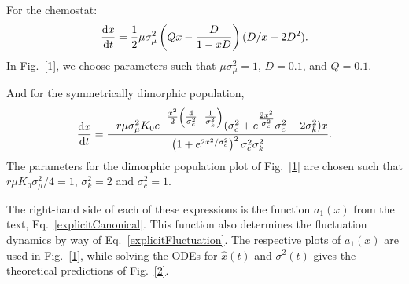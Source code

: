 For the chemostat:
\begin{equation}
	\frac{\mathrm{d} x}{\mathrm{d} t} = \frac{1}{2} \mu \sigma^2_{\mu} \left(Qx-\frac{D}{1-xD}\right) (D/x-2D^2) \label{chemostat_a1} .
\end{equation}
In Fig.~\ref{1}, we choose parameters such that $\mu \sigma^2_{\mu} = 1$, $D = 0.1$, and $Q=0.1$.  

And for the symmetrically dimorphic population,
\begin{equation}
	\frac{\mathrm{d} x}{\mathrm{d} t} = \frac{-r \mu \sigma^2_{\mu} K_0 	e^{-\tfrac{x^2}{2}\left(\tfrac{4}{\sigma_c^2}-\tfrac{1}{\sigma_k^2}\right) } (\sigma^2_c+e^{\tfrac{2 x^2}{\sigma^2_c}}\sigma^2_c-2\sigma^2_k)x} { \left(1+e^{2x^2/\sigma^2_c}\right)^2 \sigma^2_c \sigma^2_k} \label{dimorphic_a1}.
\end{equation}
The parameters for the dimorphic population plot of Fig.~\ref{1} are chosen such that $r \mu K_0 \sigma_{\mu}^2 / 4 = 1$, $\sigma_k^2 = 2$ and $\sigma_c^2 = 1$.  

The right-hand side of each of these expressions is the function $a_1(x)$ from the text, Eq.~\eqref{explicitCanonical}.  This function also determines the fluctuation dynamics by way of Eq.~\eqref{explicitFluctuation}.  The respective plots of $a_1(x)$ are used in Fig.~\ref{1}, while solving the ODEs for $\hat x(t)$ and $\sigma^2(t)$ gives the theoretical predictions of Fig.~\ref{2}.  







